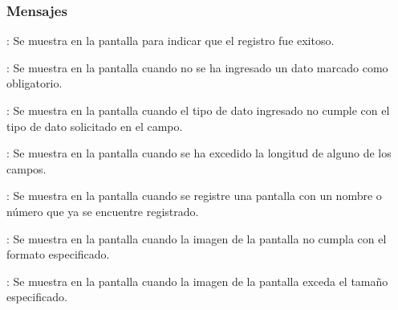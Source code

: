 \subsubsection{Mensajes}

\begin{Citemize}
	\item {}: Se muestra en la pantalla  para indicar que el registro fue exitoso.
	\item {}: Se muestra en la pantalla  cuando no se ha ingresado un dato marcado como obligatorio.
	\item {}: Se muestra en la pantalla  cuando el tipo de dato ingresado no cumple con el tipo de dato solicitado en el campo.
	\item {}: Se muestra en la pantalla  cuando se ha excedido la longitud de alguno de los campos.
	\item {}: Se muestra en la pantalla  cuando se registre una pantalla con un nombre o número que ya se encuentre registrado.
	\item {}: Se muestra en la pantalla  cuando la imagen de la pantalla no cumpla con el formato especificado.
	\item {}: Se muestra en la pantalla  cuando la imagen de la pantalla exceda el tamaño especificado.
\end{Citemize}
